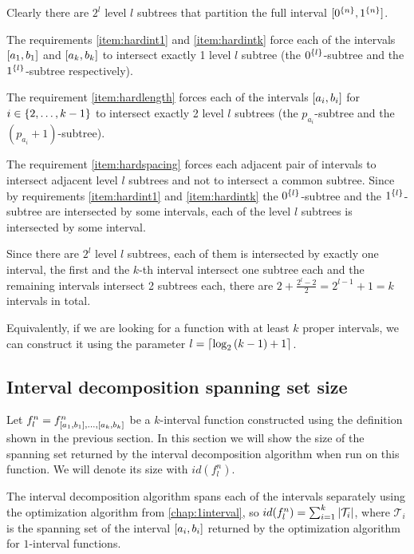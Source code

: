 Clearly there are $2^l$ level $l$ subtrees
that partition the full interval
$[0^{\{n\}}, 1^{\{n\}}]$.

The requirements
\ref{item:hardint1} and \ref{item:hardintk}
force each of the intervals
$[a_1, b_1]$ and $[a_k, b_k]$
to intersect exactly 1 level $l$ subtree
(the $0^{\{l\}}$-subtree
and the $1^{\{l\}}$-subtree respectively).

The requirement \ref{item:hardlength}
forces each of the intervals
$[a_i, b_i]$ for $i \in \{2, \ldots, k-1\}$
to intersect exactly 2 level $l$ subtrees
(the $p_{a_i}$-subtree and the $(p_{a_i}+1)$-subtree).

The requirement \ref{item:hardspacing}
forces each adjacent pair of intervals
to intersect adjacent level $l$ subtrees
and not to intersect a common subtree.
Since by requirements
\ref{item:hardint1} and \ref{item:hardintk}
the $0^{\{l\}}$-subtree
and the $1^{\{l\}}$-subtree
are intersected by some intervals,
each of the level $l$ subtrees is intersected
by some interval.

Since there are $2^l$ level $l$ subtrees,
each of them is intersected by exactly one interval,
the first and the $k$-th interval intersect
one subtree each
and the remaining intervals intersect 2 subtrees each,
there are $2 + \frac{2^l - 2}{2} = 2^{l-1} + 1 = k$
intervals in total.

Equivalently,
if we are looking for a  function
with at least $k$ proper intervals,
we can construct it using the parameter
$l = \lceil\log_2{(k-1)} + 1\rceil$.

\subsection{Interval decomposition spanning set size}

Let $f_l^n =
f^n_{[a_1, b_1], \ldots, [a_k, b_k]}$
be a $k$-interval function
constructed using the definition
shown in the previous section.
In this section we will show the size of the spanning set
returned by the interval decomposition algorithm
when run on this function.
We will denote its size with $id(f_l^n)$.

The interval decomposition algorithm spans
each of the intervals separately
using the optimization algorithm
from \cref{chap:1interval},
so $id(f_l^n) = \sum_{i=1}^k{\lvert\mathcal{T}_i\rvert}$,
where $\mathcal{T}_i$ is the spanning set
of the interval $[a_i, b_i]$
returned by the optimization algorithm
for $1$-interval functions.

